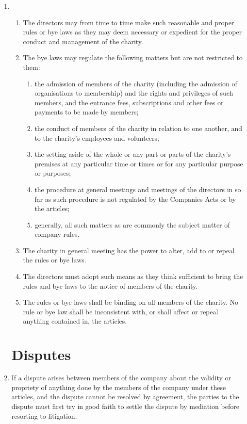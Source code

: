 \begin{enumerate}
\item
  \begin{enumerate}
  \item
    The directors may from time to time make such reasonable and proper
    rules or bye laws as they may deem necessary or expedient for the
    proper conduct and management of the charity.
  \item
    The bye laws may regulate the following matters but are not
    restricted to them:
    \begin{enumerate}
    \item
      the admission of members of the charity (including the admission of
      organisations to membership) and the rights and privileges of such
      members, and the entrance fees, subscriptions and other fees or
      payments to be made by members;
    \item
      the conduct of members of the charity in relation to one another,
      and to the charity's employees and volunteers;
    \item
      the setting aside of the whole or any part or parts of the
      charity's premises at any particular time or times or for any
      particular purpose or purposes;
    \item
      the procedure at general meetings and meetings of the directors in
      so far as such procedure is not regulated by the Companies Acts or
      by the articles;
    \item
      generally, all such matters as are commonly the subject matter of
      company rules.
    \end{enumerate}
  \item
    The charity in general meeting has the power to alter, add to or
    repeal the rules or bye laws.
  \item
    The directors must adopt such means as they think sufficient to
    bring the rules and bye laws to the notice of members of the
    charity.
  \item
    The rules or bye laws shall be binding on all members of the
    charity. No rule or bye law shall be inconsistent with, or shall
    affect or repeal anything contained in, the articles.
  \end{enumerate}

\section{Disputes}

\item
    If a dispute arises between members of the company about the validity
    or propriety of anything done by the members of the company under these
    articles, and the dispute cannot be resolved by agreement, the parties
    to the dispute must first try in good faith to settle the dispute by
    mediation before resorting to litigation.


\end{enumerate}
